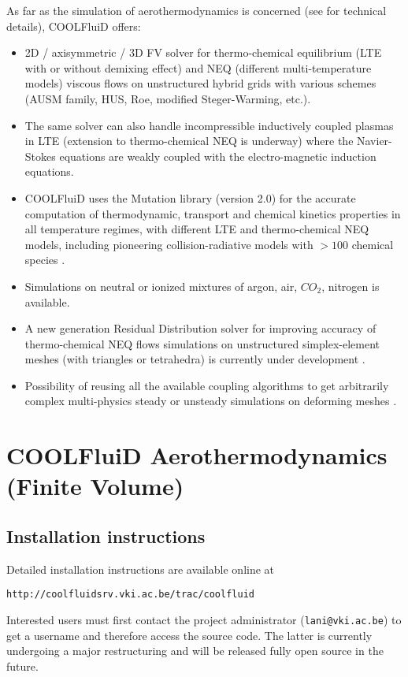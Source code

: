 \documentclass[11pt]{article}
\begin{document}
As far as the simulation of aerothermodynamics is concerned 
(see \cite{phd:lani, phd:panesi} for technical details), COOLFluiD offers: 
\begin{itemize}
\item 
  2D / axisymmetric / 3D FV solver for thermo-chemical equilibrium 
  (LTE with or without demixing effect) and NEQ 
  (different multi-temperature models) viscous flows 
  on unstructured hybrid grids with various schemes 
  (AUSM family, HUS, Roe, modified Steger-Warming, etc.).
\item 
  The same solver can also handle incompressible inductively coupled plasmas in LTE 
  (extension to thermo-chemical NEQ is underway) where the Navier-Stokes equations 
  are weakly coupled with the electro-magnetic induction equations. 
\item
  COOLFluiD uses the Mutation library (version 2.0) for the accurate computation of
  thermodynamic, transport and chemical kinetics properties in all temperature 
  regimes, with different LTE and thermo-chemical NEQ models, including pioneering  
  collision-radiative models with $> 100$ chemical species \cite{munafo10}.
\item
  Simulations on neutral or ionized mixtures of argon, air, $CO_2$, 
  nitrogen is available. 
\item 
  A new generation Residual Distribution solver for improving accuracy of 
  thermo-chemical NEQ flows simulations on unstructured simplex-element meshes 
  (with triangles or tetrahedra) is currently under development \cite{phd:lani}. 
\item
  Possibility of reusing all the available coupling algorithms to 
  get arbitrarily complex multi-physics steady or unsteady simulations 
  on deforming meshes \cite{phd:wuilbaut}.
\end{itemize}

\section{COOLFluiD Aerothermodynamics (Finite Volume)}

\subsection{Installation instructions}

Detailed installation instructions are available online at
\begin{verbatim}
http://coolfluidsrv.vki.ac.be/trac/coolfluid
\end{verbatim}
Interested users must first contact the project administrator ({\tt lani@vki.ac.be}) to 
get a username and therefore access the source code. The latter is currently undergoing a major 
restructuring and will be released fully open source in the future.
\end{document}
